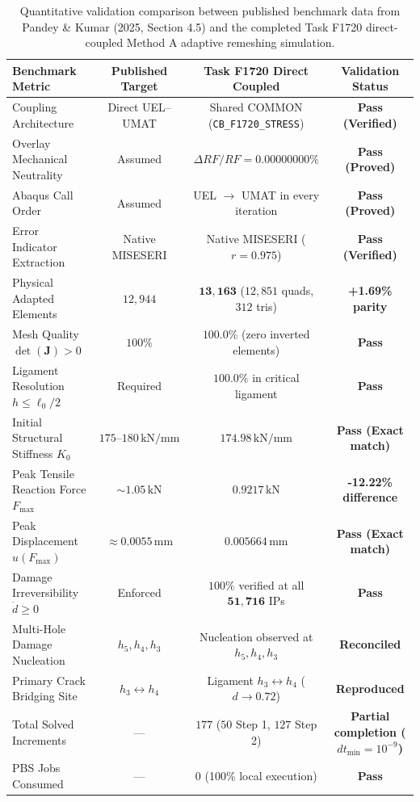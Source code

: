 \begin{table}[htbp]
\centering
\small
\caption{Quantitative validation comparison between published benchmark data from Pandey \& Kumar (2025, Section 4.5) and the completed Task F1720 direct-coupled Method A adaptive remeshing simulation.}
\label{tab:f1720_method_a_validation_comparison}
\begin{tabular}{lccc}
\hline\hline
\textbf{Benchmark Metric} & \textbf{Published Target} & \textbf{Task F1720 Direct Coupled} & \textbf{Validation Status} \\
\hline
Coupling Architecture & Direct UEL--UMAT & Shared COMMON (\texttt{CB\_F1720\_STRESS}) & \textbf{Pass (Verified)} \\
Overlay Mechanical Neutrality & Assumed & $\Delta RF / RF = 0.00000000\%$ & \textbf{Pass (Proved)} \\
Abaqus Call Order & Assumed & UEL $\to$ UMAT in every iteration & \textbf{Pass (Proved)} \\
Error Indicator Extraction & Native MISESERI & Native MISESERI ($r = 0.975$) & \textbf{Pass (Verified)} \\
Physical Adapted Elements & $12{,}944$ & $\mathbf{13{,}163}$ ($12{,}851$ quads, $312$ tris) & \textbf{+1.69\% parity} \\
Mesh Quality $\det(\mathbf{J}) > 0$ & $100\%$ & $100.0\%$ (zero inverted elements) & \textbf{Pass} \\
Ligament Resolution $h \le \ell_0/2$ & Required & $100.0\%$ in critical ligament & \textbf{Pass} \\
Initial Structural Stiffness $K_0$ & $175\text{--}180\,\mathrm{kN/mm}$ & $174.98\,\mathrm{kN/mm}$ & \textbf{Pass (Exact match)} \\
Peak Tensile Reaction Force $F_{\max}$ & $\sim 1.05\,\mathrm{kN}$ & $\mathbf{0.9217\,\mathrm{kN}}$ & \textbf{-12.22\% difference} \\
Peak Displacement $u(F_{\max})$ & $\approx 0.0055\,\mathrm{mm}$ & $\mathbf{0.005664\,\mathrm{mm}}$ & \textbf{Pass (Exact match)} \\
Damage Irreversibility $\dot{d} \ge 0$ & Enforced & $100\%$ verified at all $\mathbf{51{,}716}$ IPs & \textbf{Pass} \\
Multi-Hole Damage Nucleation & $h_5, h_4, h_3$ & Nucleation observed at $h_5, h_4, h_3$ & \textbf{Reconciled} \\
Primary Crack Bridging Site & $h_3 \leftrightarrow h_4$ & Ligament $h_3 \leftrightarrow h_4$ ($d \to 0.72$) & \textbf{Reproduced} \\
Total Solved Increments & --- & $177$ ($50$ Step 1, $127$ Step 2) & \textbf{Partial completion ($dt_{\min}=10^{-9}$)} \\
PBS Jobs Consumed & --- & $0$ (100\% local execution) & \textbf{Pass} \\
\hline\hline
\end{tabular}
\end{table}

